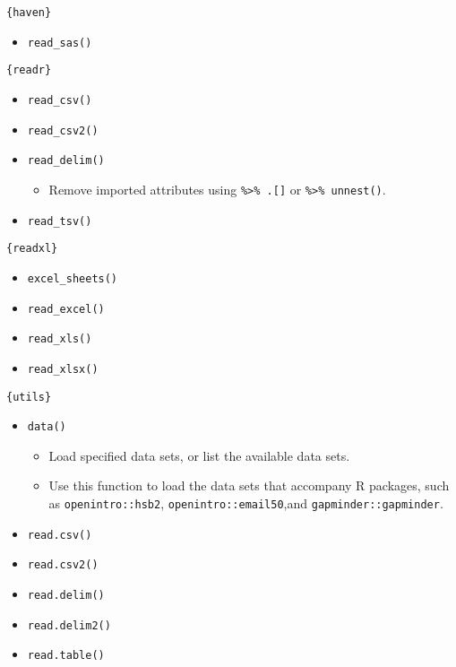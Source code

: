 \documentclass[
]{book}
\providecommand{\tightlist}{%
  \setlength{\itemsep}{0pt}\setlength{\parskip}{0pt}}
\begin{document}
\texttt{\{haven\}}

\begin{itemize}
\tightlist
\item
  \texttt{read\_sas()}
\end{itemize}

\texttt{\{readr\}}

\begin{itemize}
\tightlist
\item
  \texttt{read\_csv()}
\item
  \texttt{read\_csv2()}
\item
  \texttt{read\_delim()}

  \begin{itemize}
  \tightlist
  \item
    Remove imported attributes using \texttt{\%\textgreater{}\%\ .{[}{]}} or \texttt{\%\textgreater{}\%\ unnest()}.
  \end{itemize}
\item
  \texttt{read\_tsv()}
\end{itemize}

\texttt{\{readxl\}}

\begin{itemize}
\tightlist
\item
  \texttt{excel\_sheets()}
\item
  \texttt{read\_excel()}
\item
  \texttt{read\_xls()}
\item
  \texttt{read\_xlsx()}
\end{itemize}

\texttt{\{utils\}}

\begin{itemize}
\tightlist
\item
  \texttt{data()}

  \begin{itemize}
  \tightlist
  \item
    Load specified data sets, or list the available data sets.
  \item
    Use this function to load the data sets that accompany R packages, such as \texttt{openintro::hsb2}, \texttt{openintro::email50},and \texttt{gapminder::gapminder}.
  \end{itemize}
\item
  \texttt{read.csv()}
\item
  \texttt{read.csv2()}
\item
  \texttt{read.delim()}
\item
  \texttt{read.delim2()}
\item
  \texttt{read.table()}
\end{itemize}
\end{document}
